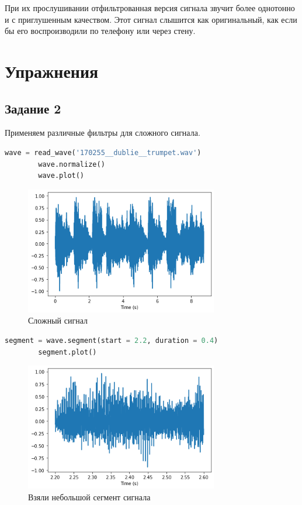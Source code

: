 \documentclass[a4paper, 12pt]{report}
\begin{document}
	При их прослушивании отфильтрованная версия сигнала звучит более однотонно и с приглушенным качеством. Этот сигнал слышится как оригинальный, как если бы его воспроизводили по телефону или через стену.

	\chapter{Упражнения}
	\section{Задание 2}
	Применяем различные фильтры для сложного сигнала.
	\begin{lstlisting}[language=Python,caption=Получение сложного сигнала]
		wave = read_wave('170255__dublie__trumpet.wav')
		wave.normalize()
		wave.plot()
	\end{lstlisting}
	\begin{figure}[H]
		\centering
		\includegraphics[width=0.75\textwidth]{wave1.png}
		\caption{Сложный сигнал}
		\label{fig:wave1}
	\end{figure}
	\begin{lstlisting}[language=Python,caption=Сегмент сигнала]
		segment = wave.segment(start = 2.2, duration = 0.4)
		segment.plot()
	\end{lstlisting}
	\begin{figure}[H]
		\centering
		\includegraphics[width=0.75\textwidth]{wave2.png}
		\caption{Взяли небольшой сегмент сигнала}
		\label{fig:wave2}
	\end{figure}
\end{document}
